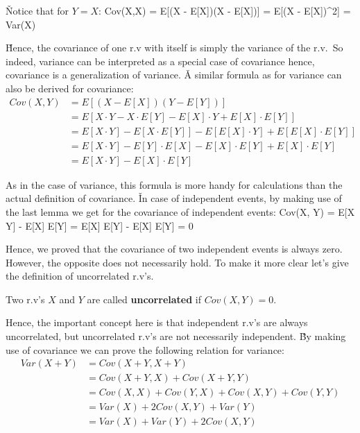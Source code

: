 \v

Notice that for $Y=X$:
\bse
Cov(X,X) = E[(X - E[X])(X - E[X])] = E[(X - E[X])^2] = Var(X)
\ese

\v

Hence, the covariance of one r.v with itself is simply the variance of the r.v.\ So indeed, variance can be
interpreted as a special case of covariance hence, covariance is a generalization of variance. \v

A similar formula as for variance can also be derived for covariance:
\begin{align*}
Cov(X, Y) &= E[(X - E[X])(Y-E[Y])] \\
&= E[X \cdot Y - X \cdot E[Y] - E[X] \cdot Y + E[X] \cdot E[Y]] \\
&= E[X \cdot Y] - E[X \cdot E[Y]] - E[E[X] \cdot Y] + E[E[X] \cdot E[Y]] \\
&= E[X \cdot Y] - E[Y] \cdot E[X] - E[X] \cdot E[Y] + E[X] \cdot E[Y] \\
&= E[X \cdot Y] - E[X] \cdot E[Y]
\end{align*}

As in the case of variance, this formula is more handy for calculations than the actual definition of covariance. \v

In case of independent events, by making use of the last lemma we get for the covariance of independent events:
\bse
Cov(X, Y) = E[X \cdot Y] - E[X] \cdot E[Y] = E[X] \cdot E[Y] - E[X] \cdot E[Y] = 0
\ese

Hence, we proved that the covariance of two independent events is always zero. However, the opposite does not
necessarily hold. To make it more clear let's give the definition of uncorrelated r.v's.

Two r.v's $X$ and $Y$ are called \textbf{uncorrelated} if $Cov(X, Y) = 0$.
\ed

Hence, the important concept here is that independent r.v's are always uncorrelated, but uncorrelated r.v's are not
necessarily independent. \v

By making use of covariance we can prove the following relation for variance:
\begin{align*}
Var(X + Y) &= Cov(X+Y, X+Y) \\
&= Cov(X+Y, X) + Cov(X+Y, Y) \\
&= Cov(X, X) + Cov(Y, X) + Cov(X, Y) + Cov(Y, Y) \\
&= Var(X) + 2Cov(X,Y) + Var(Y) \\
&= Var(X) + Var(Y) + 2Cov(X,Y)
\end{align*}

